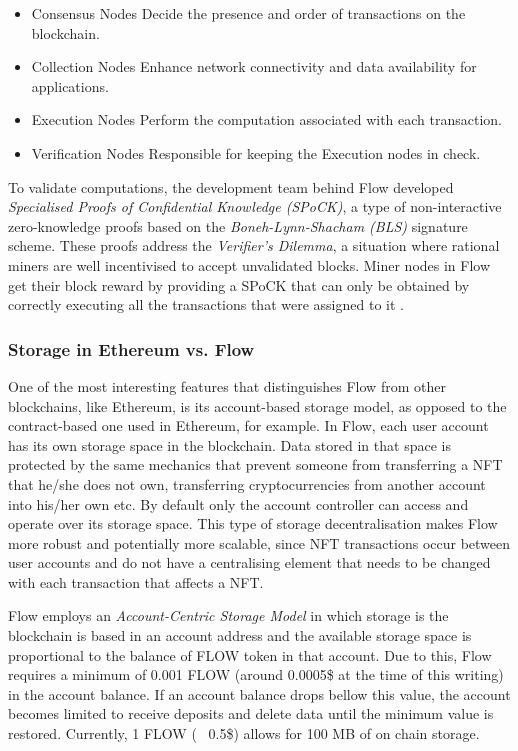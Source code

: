 \documentclass[../main.tex]{subfiles}
\begin{document}
\begin{itemize}
    \item{Consensus Nodes} Decide the presence and order of transactions on the blockchain.
    \item {Collection Nodes} Enhance network connectivity and data availability for applications.
    \item {Execution Nodes} Perform the computation associated with each transaction.
    \item {Verification Nodes} Responsible for keeping the Execution nodes in check.
\end{itemize}

To validate computations, the development team behind Flow developed \textit{Specialised Proofs of Confidential Knowledge (SPoCK)}, a type of non-interactive zero-knowledge proofs based on the \textit{Boneh-Lynn-Shacham (BLS)} signature scheme. These proofs address the \textit{Verifier's Dilemma}, a situation where rational miners are well incentivised to accept unvalidated blocks. Miner nodes in Flow get their block reward by providing a SPoCK that can only be obtained by correctly executing all the transactions that were assigned to it \cite{Ben2020}.


\subsubsection{Storage in Ethereum vs. Flow}
One of the most interesting features that distinguishes Flow from other blockchains, like Ethereum, is its account-based storage model, as opposed to the contract-based one used in Ethereum, for example. In Flow, each user account has its own storage space in the blockchain. Data stored in that space is protected by the same mechanics that prevent someone from transferring a NFT that he/she does not own, transferring cryptocurrencies from another account into his/her own etc. By default only the account controller can access and operate over its storage space. This type of storage decentralisation makes Flow more robust and potentially more scalable, since NFT transactions occur between user accounts and do not have a centralising element that needs to be changed with each transaction that affects a NFT.
\par
Flow employs an \textit{Account-Centric Storage Model} in which storage is the blockchain is based in an account address and the available storage space is proportional to the balance of FLOW token in that account. Due to this, Flow requires a minimum of 0.001 FLOW (around 0.0005\$ at the time of this writing) in the account balance. If an account balance drops bellow this value, the account becomes limited to receive deposits and delete data until the minimum value is restored. Currently, 1 FLOW (~ 0.5\$) allows for 100 MB of on chain storage.
\end{document}
